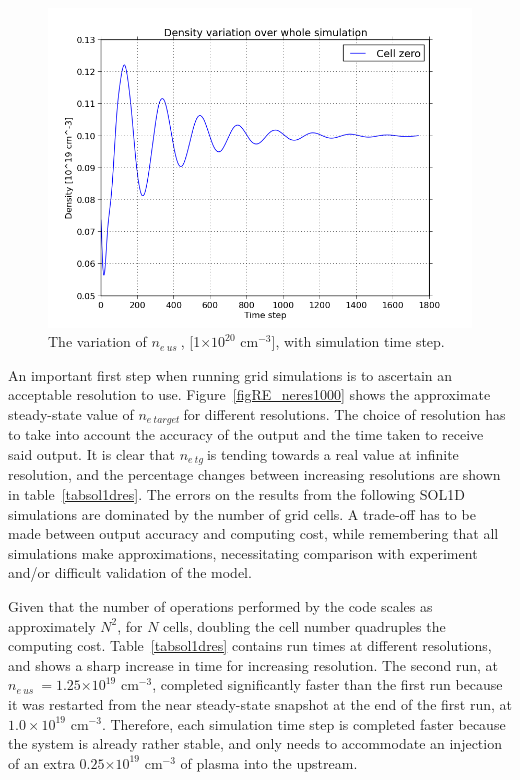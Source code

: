 \documentclass[12pt]{article}  %
\providecommand{\e}[1]{\ensuremath{\times 10^{#1}}} %
\providecommand{\noNe}[1]{{${#1}\times 10^{19}$ cm$^{-3}$}} %
\providecommand{\pow}[1]{{$^{#1}$}} %
\providecommand{\neus}{$n_{e~us}~$} %
\providecommand{\netarget}{$n_{e~target}~$} %
\providecommand{\netg}{$n_{e~tg}~$} %
\begin{document}
\begin{figure}
	\includegraphics[scale=0.4]{Figures/sol1d/ne_var_ny=800.png}
	\centering
	\caption{The variation of \neus, [1\e{20} cm\pow{-3}], with simulation time step. }\label{figne_var_ny=800}
\end{figure}

An important first step when running grid simulations is to ascertain an acceptable resolution to use. Figure~\ref{figRE_neres1000} shows the approximate steady-state value of \netarget for different resolutions. The choice of resolution has to take into account the accuracy of the output and the time taken to receive said output. It is clear that \netg is tending towards a real value at infinite resolution, and the percentage changes between increasing resolutions are shown in table~\ref{tabsol1dres}. The errors on the results from the following SOL1D simulations are dominated by the number of grid cells. A trade-off has to be made between output accuracy and computing cost, while remembering that all simulations make approximations, necessitating comparison with experiment and/or difficult validation of the model.

Given that the number of operations performed by the code scales as approximately $N^2$, for $N$ cells, doubling the cell number quadruples the computing cost. Table~\ref{tabsol1dres} contains run times at different resolutions, and shows a sharp increase in time for increasing resolution. The second run, at \neus $= 1.25\e{19}$ cm$^{-3}$, completed significantly faster than the first run because it was restarted from the near steady-state snapshot at the end of the first run, at \noNe{1.0}. Therefore, each simulation time step is completed faster because the system is already rather stable, and only needs to accommodate an injection of an extra $0.25\e{19}$ cm$^{-3}$ of plasma into the upstream.
\end{document}
